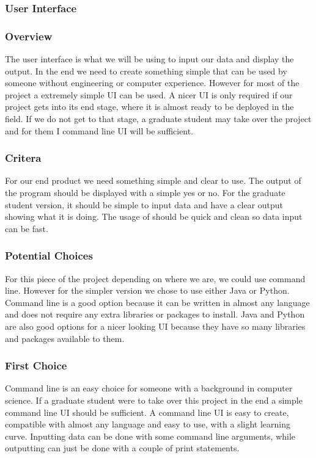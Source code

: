 \subsubsection*{User Interface}
	\subsubsection*{Overview}
	The user interface is what we will be using to input our data and display the output. In the end we need to create something simple that can be used by someone without engineering or computer experience. However for most of the project a extremely simple UI can be used. A nicer UI is only required if our project gets into its end stage, where it is almost ready to be deployed in the field. If we do not get to that stage, a graduate student may take over the project and for them I command line UI will be sufficient.	
	\subsubsection*{Critera}
	For our end product we need something simple and clear to use. The output of the program should be displayed with a simple yes or no. For the graduate student version, it should be simple to input data and have a clear output showing what it is doing. The usage of should be quick and clean so data input can be fast.
	\subsubsection*{Potential Choices}
	For this piece of the project depending on where we are, we could use command line. However for the simpler version we chose to use either Java or Python. Command line is a good option because it can be written in almost any language and does not require any extra libraries or packages to install. Java and Python are also good options for a nicer looking UI because they have so many libraries and packages available to them.
	\subsubsection*{First Choice}
	Command line is an easy choice for someone with a background in computer science. If a graduate student were to take over this project in the end a simple command line UI should be sufficient. A command line UI is easy to create, compatible with almost any language and easy to use, with a slight learning curve. Inputting data can be done with some command line arguments, while outputting can just be done with a couple of print statements.
